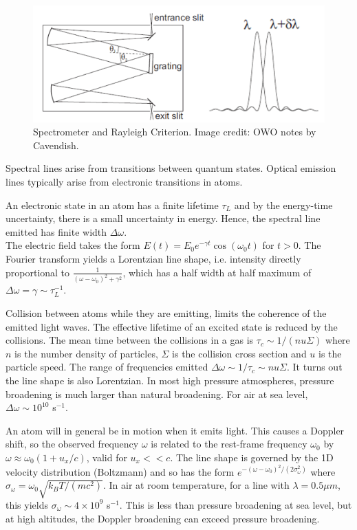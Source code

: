 \documentclass[a4paper]{article}
\begin{document}
\begin{figure}[H]
    \centering
    \includegraphics[scale=0.65]{spectrometer.PNG}
    \caption{Spectrometer and Rayleigh Criterion. Image credit: OWO notes by Cavendish.}
\end{figure}
\begin{defi}
Spectral lines arise from transitions between quantum states. Optical emission lines typically arise from electronic transitions in atoms.
\end{defi}
\begin{Note}
An electronic state in an atom has a finite lifetime $\tau_L$ and by the energy-time uncertainty, there is a small uncertainty in energy. Hence, the spectral line emitted has finite width $\Delta\omega$.\\[5pt]
The electric field takes the form $E(t)=E_0e^{-\gamma t}\cos(\omega_0t)$ for $t>0$. The Fourier transform yields a Lorentzian line shape, i.e. intensity directly proportional to $\frac{1}{(\omega-\omega_0)^2+\gamma^2}$, which has a half width at half maximum of $\Delta\omega=\gamma\sim\tau_L^{-1}$. 
\end{Note}
\begin{Note}
Collision between atoms while they are emitting, limits the coherence of the emitted light waves. The effective lifetime of an excited state is reduced by the collisions. The mean time between the collisions in a gas is $\tau_c\sim1/(n u\Sigma)$ where $n$ is the number density of particles, $\Sigma$ is the collision cross section and $u$ is the particle speed. The range of frequencies emitted $\Delta\omega\sim1/\tau_c\sim nu\Sigma$. It turns out the line shape is also Lorentzian. In most high pressure atmospheres, pressure broadening is much larger than natural broadening. For air at sea level, $\Delta\omega\sim10^{10}$ s$^{-1}$.
\end{Note}
\begin{Note}
An atom will in general be in motion when it emits light. This causes a Doppler shift, so the observed frequency $\omega$ is related to the rest-frame frequency $\omega_0$ by $\omega\approx\omega_0(1+u_x/c)$, valid for $u_x<<c$. The line shape is governed by the 1D velocity distribution (Boltzmann) and so has the form $e^{-(\omega-\omega_0)^2/(2\sigma_\omega^2)}$ where $\sigma_\omega=\omega_0\sqrt{k_BT/(mc^2)}$. In air at room temperature, for a line with $\lambda=0.5\mu m$, this yields $\sigma_\omega\sim 4\times10^9$ s$^{-1}$. This is less than pressure broadening at sea level, but at high altitudes, the Doppler broadening can exceed pressure broadening.
\end{Note}
\end{document}
